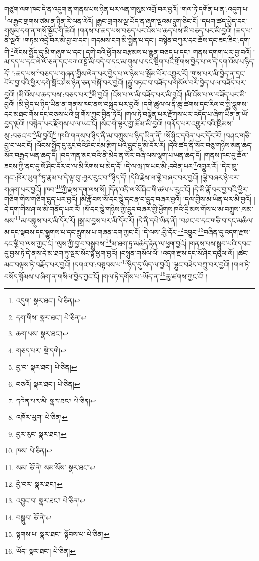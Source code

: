 གཙུག་ལག་ཁང་དེ་ན་འདུག་ན་གནས་པས་ཉིན་པར་ལན་གསུམ་འགྲོ་བར་བྱའོ། །གལ་ཏེ་དགོན་པ་ན་:འདུག་པ་\footnote{འདུག་  སྣར་ཐང་།  པེ་ཅིན། }ལ་རྒྱང་གྲགས་ཙམ་ན་ཉིན་རེ་ལན་རེའོ། །རྒྱང་གྲགས་ལྔ་ཡོད་ན་ཞག་ལྔའམ་དྲུག་ཅིང་ངོ། །དཔག་ཚད་ཕྱེད་དང་གསུམ་དག་ན་གསོ་སྦྱོང་གི་ཚེའོ། །གནས་པ་ཆད་པས་བཅད་པར་འོས་པ་ཆད་པས་མི་བཅད་པར་མི་བྱའོ། །ཆད་པ་ནི་ལྔའོ། །གཏམ་འདྲེ་བར་མི་བྱ་བ་དང་། གདམས་ངག་མི་སྦྱིན་པ་དང་། བསྙེན་བཀུར་དང་ཆོས་དང་ཟང་ཟིང་:དག་གི་\footnote{དག་གིས་  སྣར་ཐང་།  པེ་ཅིན། }ལོངས་སྤྱོད་དུ་མི་གཞུག་པ་དང་། དགེ་བའི་ཕྱོགས་བརྩམས་པ་རྒྱུན་བཅད་པ་དང་། གནས་དགག་པར་བྱ་བའོ། །མ་དད་པ་དང་ལེ་ལོ་ཅན་དང་བཀའ་བློ་མི་བདེ་བ་དང་མ་གུས་པ་དང་སྡིག་པའི་གྲོགས་བྱེད་པ་ལ་དེ་དག་འོས་པ་ཉིད་དོ། །:ཆད་པས་\footnote{ཆག་པས་  སྣར་ཐང་། }བཅད་པ་གཞན་གྱིས་ལེན་པར་བྱེད་པ་ལ་ཉེས་པ་སྦོམ་པོར་འགྱུར་རོ། །གུས་པར་མི་བྱེད་ན་དྲང་པོར་བྱ་བའི་ཕྱིར་དགེ་སློང་ཤེས་ཉེན་ཅན་བསྐོ་བར་བྱའོ། །རྒྱུ་བཏང་བ་བཟོད་པ་གསོལ་བར་བྱེད་པ་ལ་བཟོད་པར་བྱའོ། །མི་འོས་པ་ཆད་པས་:བཅད་པར་\footnote{གཅད་པར་  སྡེ་དགེ། }མི་བྱའོ། །འོས་པ་ལ་མི་བཟོད་པར་མི་བྱའོ། །མི་འོས་པ་ལ་བཟོད་པར་མི་བྱའོ། །མི་བྱེད་པ་ཉིད་ཡིན་ན་གནས་ཁང་ནས་བསྐྲད་པར་བྱའོ། །དགེ་ཚུལ་ལ་ནི་ཆུ་ཚགས་དང་རིལ་བ་སྤྱི་བླུགས་དང་མཐང་གོས་དང་བཅས་པའི་བླ་གོས་ཀྱང་བྱིན་ཏེའོ། །གལ་ཏེ་བསྙེན་པར་རྫོགས་པར་འདོད་པ་ཞིག་ཡིན་ན་ཡོ་བྱད་ལྔའོ། །བསྙེན་པར་རྫོགས་པ་ལ་ཡང་ངོ། །སེང་གེ་ལྟར་གྱ་ཚོམ་མི་བྱའོ། །གནོད་པར་འགྱུར་བའི་ཁྲིམས་སུ་:བཅའ་བ་\footnote{བྱ་བ་  སྣར་ཐང་།  པེ་ཅིན། }མི་བྱའོ།\footnote{བཅའོ།  སྣར་ཐང་།  པེ་ཅིན། } །ཁའི་གནས་པ་ཉིད་ནི་མ་བཀྲུས་པ་ཉིད་ཡིན་ནོ། །སོ་ཤིང་དབེན་པར་དོར་རོ། །བཤང་གཅི་བྱ་བ་ཡང་ངོ། །ལོངས་སྤྱོད་དུ་རུང་བའི་ཤིང་ངམ་རྩིག་པའི་དྲུང་དུ་མི་དོར་རོ། །དེའི་ཚད་ནི་སོར་བཅུ་གཉིས་མན་ཆད་སོར་བརྒྱད་ཡན་ཆད་དོ། །བད་ཀན་མང་བའི་ནི་མེད་ན་སོར་བཞི་ལས་ལྷག་པ་ཡན་ཆད་དོ། །གནས་ཁང་དུ་ཆོལ་ཟངས་ཀྱི་ནང་དུ་སོ་ཤིང་དོར་བ་ལ་མི་རིགས་པ་མེད་དོ། །དེ་ལ་ཝ་ཁ་ཡང་མི་:དབེན་པར་\footnote{དབེན་པར་མི་  སྣར་ཐང་།  པེ་ཅིན། }འགྱུར་རོ། །དེར་ཁྲུ་གང་:ཁོར་ཡུག་\footnote{འཁོར་ཡུག་  པེ་ཅིན། }ཏུ་རྣམ་པ་དེ་ལྟ་བུ་:བྱར་རུང་བ་\footnote{བྱར་རུང་  སྣར་ཐང་། }ཉིད་དོ། །དེའི་རྗེས་ལ་ལྕེ་བཞར་བར་བྱའོ། །ལྕེ་བཞར་ཉེ་བར་གཞག་པར་བྱའོ། །ཁབ་\footnote{ཁས་  པེ་ཅིན། }ཀྱི་རྫས་དག་ལས་སོ། །དོན་འདི་ལ་སོ་ཤིང་གི་ཚལ་པ་རུང་ངོ། །དེ་མི་རྣོ་བར་བྱ་བའི་ཕྱིར་གཅིག་གིས་གཅིག་དྲུད་པར་བྱའོ། །མི་རྣོ་བས་སོ་དང་ལྕེ་དང་རྣ་བ་དྲུད་བཞར་བྱའོ། །དལ་གྱིས་མ་ཡིན་པར་མི་བྱའོ། །དེ་དག་གིས་ཤ་ལ་མི་གནོད་པར་རོ། །སོ་དང་ལྕེ་གཉིས་ཀྱི་དྲུད་བཞར་གྱི་ཕྱོགས་ཁའི་དྲི་མས་གོས་པ་མ་བཀྲུས་:སམ་སས་\footnote{སམ་  ཅོ་ནེ། སམ་སོས་  སྣར་ཐང་། }མ་བསྐུས་པར་མི་དོར་རོ། །སྒྲ་མ་བྱས་པར་མི་དོར་རོ། །དེ་ནི་དཔེ་ཡིན་ནོ། །བཤང་བ་དང་གཅི་བ་དང་མཆིལ་མ་དང་སྣབས་དང་སྐྱུགས་པ་དང་རླུགས་པ་གཞན་དག་ཀྱང་ངོ། །དེ་ལས་:བྱི་དོར་\footnote{བྱི་བར་  སྣར་ཐང་། }འབྱུང་\footnote{འབྱུང་བ་  སྣར་ཐང་།  པེ་ཅིན། }བཞིན་དུ་འདག་རྫས་དང་ལྕི་བ་ལས་ཀྱང་ངོ། །ལུས་ཀྱི་བྱ་བ་བསྒྲུབས་\footnote{བསྒྲུབ་  ཅོ་ནེ། }མ་ཐག་ཏུ་མཆོད་རྟེན་ལ་ཕྱག་བྱའོ། །གནས་པས་སྒྲུབ་པའི་དབང་དུ་བྱས་ཏེ་དེ་ནས་དེ་མ་ཐག་ཏུ་སྔར་སོང་སྟེ་ཕྱག་བྱའོ། །བསྙུན་གསོལ་ལོ། །འདག་རྫས་དང་སོ་ཤིང་དབུལ་ལོ། །ཚང་མང་བལྟས་ཏེ་བརྗོད་པར་བྱའོ། །དགའ་བ་:བསྟབས་པ་\footnote{སྟགས་པ་  སྣར་ཐང་། སྟོབས་པ་  པེ་ཅིན། }ཉིད་དུ་ཡིད་ལ་བྱའོ། །ལྷུང་བཟེད་བཀྲུ་བར་བྱའོ། །གལ་ཏེ་བསོད་སྙོམས་པ་ཞིག་ན་གསིལ་བྱེད་ཀྱང་ངོ། །གལ་ཏེ་དགོས་པ་:ཡོད་ན་\footnote{ཡོད་  སྣར་ཐང་།  པེ་ཅིན། }ཆུ་ཚགས་ཀྱང་ངོ། །
